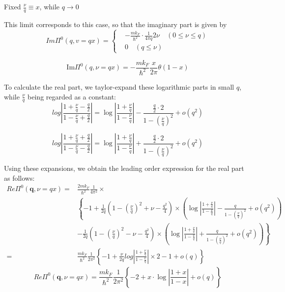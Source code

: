 \begin{itemize}
\begin{center}Fixed $\frac{\nu}{q} \equiv x$, while $q\rightarrow 0$ \end{center}

This limit corresponds to this case, so that the imaginary part is given by
\[ Im\Pi^0(q,v=q x) = \left\{ \begin{aligned}&-\frac{m k_F}{\hbar^2} \cdot \frac{1}{4\pi q} 2\nu \quad (0\leq \nu \leq q)\\
&0 \quad (q \leq \nu) \end{aligned} \right. \]

\begin{equation*} \label{Eqs2.8.27.a} \tag{2.8.27.a}
\text{Im} \Pi^0(q,\nu=q x) = -\frac{m k_F}{\hbar^2}\frac{x}{2\pi} \theta(1-x)
\end{equation*}
\setcounter{equation}{27}

To calculate the real part, we taylor-expand these logarithmic parts in small $q$, while $\frac{\nu}{q}$ being regarded as a constant:
\[log\left| \frac{1+\frac{\nu}{q}-\frac{q}{2}}{1-\frac{\nu}{q}+\frac{q}{2}} \right| = \log \left| \frac{1+\frac{\nu}{q}}{1-\frac{\nu}{q}} \right| - \frac{\frac{q}{2}\cdot 2}{1-(\frac{\nu}{q})^2} + o(q^2)\]

\[log\left| \frac{1+\frac{\nu}{q}+\frac{q}{2}}{1-\frac{\nu}{q}-\frac{q}{2}} \right| = \log \left| \frac{1+\frac{\nu}{q}}{1-\frac{\nu}{q}} \right| + \frac{\frac{q}{2}\cdot 2}{1-(\frac{\nu}{q})^2} + o(q^2)\]

Using these expansions, we obtain the leading order expression for the real part as follows:
\[ \begin{split}Re\Pi^0(\mathbf{q},\nu=q x) =& \frac{2m k_F}{\hbar^2} \frac{1}{4\pi^2} \times\\
&\left\{ -1 + \frac{1}{2q}\left( 1-(\frac{\nu}{q})^2+\nu-\frac{q^2}{4} \right) \times \left( \log \left| \frac{1+\frac{\nu}{q}}{1-\frac{\nu}{q}} \right| - \frac{q}{1-(\frac{\nu}{q})^2} + o(q^2) \right) \right.\\
&\left.-\frac{1}{2q}\left( 1-(\frac{\nu}{q})^2-\nu-\frac{q^2}{4} \right) \times \left( \log \left| \frac{1+\frac{\nu}{q}}{1-\frac{\nu}{q}} \right| + \frac{q}{1-(\frac{\nu}{q})^2} + o(q^2) \right)\right\}\\
=&\frac{m k_F}{\hbar^2} \frac{1}{2\pi^2}\left\{ -1 + \frac{\nu}{2q}log\left| \frac{1+\frac{\nu}{q}}{1-\frac{\nu}{q}} \right| \times 2 - 1 + o(q) \right\}
\end{split}\]
\begin{equation*} \label{Eqs2.8.27.b} \tag{2.8.27.b}
Re\Pi^0(\mathbf{q},\nu=q x)=\frac{m k_F}{\hbar^2} \frac{1}{2\pi^2} \left\{ -2 + x\cdot \log\left| \frac{1+x}{1-x} \right|+ o(q) \right\}
\end{equation*}
\end{itemize}

